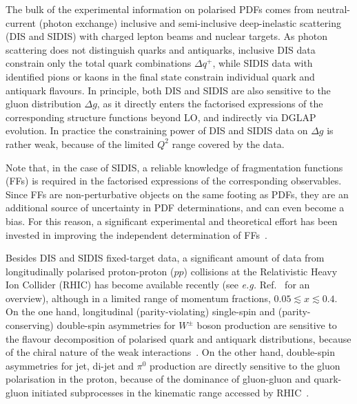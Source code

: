 The bulk of the experimental information on polarised PDFs comes from 
neutral-current (photon exchange) inclusive and semi-inclusive deep-inelastic scattering 
(DIS and SIDIS) with charged lepton beams and nuclear targets. 
%
As photon scattering does not distinguish quarks and antiquarks, inclusive DIS 
data constrain only the total quark combinations $\Delta q^+$, 
while SIDIS data with identified pions or kaons in the final state 
constrain individual quark and antiquark flavours. 
%
In principle, both DIS and SIDIS are also sensitive to the gluon 
distribution $\Delta g$, as it directly enters the factorised expressions of
the corresponding structure functions beyond LO, and indirectly via DGLAP 
evolution.
%
In practice the constraining power of DIS and SIDIS data on $\Delta g$ is 
rather weak, because of the limited $Q^2$ range covered by the data. 

Note that, in the case of SIDIS, a reliable knowledge of fragmentation 
functions (FFs) is required in the factorised expressions of the 
corresponding observables. 
%
Since FFs are non-perturbative objects on the same footing as PDFs, they are 
an additional source of uncertainty in PDF determinations, and can  
even become a bias.
%
For this reason, a significant experimental and theoretical effort has been
invested in improving the independent determination of 
FFs~\cite{deFlorian:2014xna,deFlorian:2017lwf,
Hirai:2016loo,Sato:2016tuz,Nocera:2017qgb,Bertone:2017xsf,Ethier:2017zbq}.

Besides DIS and SIDIS fixed-target data, a significant amount of data from
longitudinally polarised proton-proton ($pp$) collisions at the Relativistic 
Heavy Ion Collider (RHIC) has become available recently (see {\it e.g.} 
Ref.~\cite{Aschenauer:2015eha} for an overview), although in a limited range 
of momentum fractions, $0.05\lesssim x \lesssim 0.4$.
%
On the one hand, longitudinal (parity-violating) single-spin and 
(parity-conserving) double-spin asymmetries for $W^\pm$ boson production are 
sensitive to the flavour decomposition of polarised quark and antiquark 
distributions, because of the chiral nature of the weak 
interactions~\cite{Bourrely:1993dd}. 
%
On the other hand, double-spin asymmetries for jet, di-jet and $\pi^0$ 
production are directly sensitive to the gluon polarisation in 
the proton, because of the dominance of gluon-gluon and quark-gluon initiated 
subprocesses in the kinematic range accessed by RHIC~\cite{Bourrely:1990pz}.

